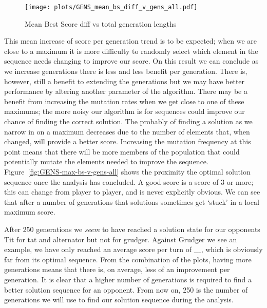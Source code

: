 \begin{figure}[h]
    \texttt{[image: plots/GENS\_mean\_bs\_diff\_v\_gens\_all.pdf]}
    \caption{Mean Best Score diff vs total generation lengths}\label{fig:GENS-mean-bs-diff-v-gens-all}
\end{figure}

This mean increase of score per generation trend is to be expected;
when we are close to a maximum it is more difficulty to randomly select which element in the sequence needs changing to improve our score.
On this result we can conclude as we increase generations there is less and less benefit per generation.
There is, however, still a benefit to extending the generations but we may have better performance by altering another parameter of the algorithm.
There may be a benefit from increasing the mutation rates when we get close to one of these maximums;
the more noisy our algorithm is for sequences could improve our chance of finding the correct solution.
The probably of finding a solution as we narrow in on a maximum decreases due to the number of elements that, when changed, will provide a better score.
Increasing the mutation frequency at this point means that there will be more members of the population that could potentially mutate the elements needed to improve the sequence.\\

Figure~\ref{fig:GENS-max-bs-v-gens-all} shows the proximity the optimal solution sequence once the analysis has concluded.
A good score is a score of 3 or more;
this can change from player to player, and is never explicitly obvious.
We can see that after a number of generations that solutions sometimes get `stuck' in a local maximum score.


After 250 generations we \textit{seem} to have reached a solution state for our opponents Tit for tat and alternator but not for grudger.
Against Grudger we see an example, we have only reached an average score per turn of $\_\_\_$, which is obviously far from its optimal sequence.
From the combination of the plots, having more generations means that there is, on average, less of an improvement per generation.
It is clear that a higher number of generations is required to find a better solution sequence for an opponent.
From now on, 250 is the number of generations we will use to find our solution sequence during the analysis.\\


